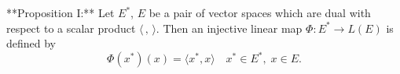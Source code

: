 **Proposition I:** Let $E^*$, $E$ be a pair of vector spaces which are dual with respect to a scalar product $\langle \, , \, \rangle$. Then an injective linear map $\Phi: E^* \rightarrow L(E)$ is defined by
$$\Phi(x^*)(x) = \langle x^*, x \rangle \quad x^* \in E^*, \; x \in E.$$
